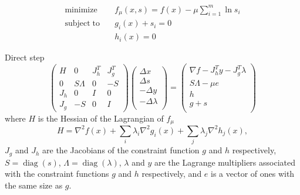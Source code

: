 \begin{align}
\mathrm{minimize} \quad & f_\mu(x,s) = f(x) - \mu \sum_{i=1}^{m} \ln s_i \nonumber \\
\mathrm{subject\;to} \quad & g_i(x) + s_i = 0 \\
                           & h_i(x) = 0 \nonumber
\end{align}

Direct step
\begin{equation}
\begin{pmatrix}
  H   & 0        & J_h^T & J_g^T \\
  0   & S\Lambda & 0     & -S \\
  J_h & 0        & I     & 0 \\
  J_g & -S       & 0     & I
\end{pmatrix}
\begin{pmatrix}
  \Delta x  \\
  \Delta s  \\
  -\Delta y \\
  -\Delta \lambda \\
\end{pmatrix}
=
\begin{pmatrix}
\nabla f - J_h^T y - J_g^T \lambda  \\
S\Lambda - \mu e \\
h \\
g + s \\
\end{pmatrix}
\end{equation}
where $H$ is the Hessian of the Lagrangian of $f_\mu$
\begin{equation}
H = \nabla^2 f(x) + \sum_i \lambda_i \nabla^2 g_i(x) + \sum_j \lambda_j \nabla^2 h_j(x),
\end{equation}
$J_g$ and $J_h$ are the Jacobians of the constraint function $g$ and $h$ respectively, $S = \operatorname{diag}(s)$, $\Lambda = \operatorname{diag}(\lambda)$, $\lambda$ and $y$ are the Lagrange multipliers associated with the constraint functions $g$ and $h$ respectively, and $e$ is a vector of ones with the same size as $g$.


